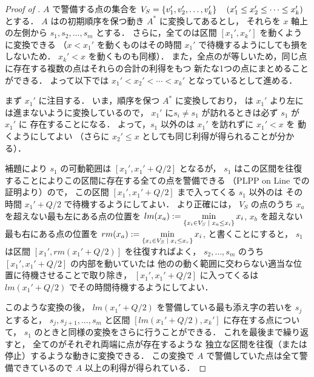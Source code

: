 \begin{proof}[Proof of ]
	$A$ で警備する点の集合を
	$V_S = \left\{{ v_1', v_2', \ldots, v_k' }\right\}
	 \quad (  x_1' \leq x_2' \leq \cdots \leq x_k'  )$
	とする．
	$A$ は\server の初期順序を保つ動き $A^*$ に変換してあるとし，
	それらを $x$ 軸上の左側から $s_1, s_2, \ldots, s_m$ とする．
	さらに，全ての\server は区間 $[x_1', x_k']$ を動くように変換できる
	（$x < x_1'$ を動くものはその時間 $x_1'$ で待機するようにしても損をしないため．
	$x_k' < x$ を動くものも同様）．
	また，全点の\shuki が等しいため，同じ点に存在する複数の点はそれらの合計の利得をもつ
	新たな1つの点にまとめることができる．
	よって以下では $x_1' < x_2' < \cdots < x_k'$ となっているとして進める．

	まず $x_1'$ に注目する．
	いま，\server 順序を保つ $A^*$ に変換しており，
	\server は $x_1'$ より左には進まないように変換しているので，
	$x_1'$ に\server $s_i \neq s_1$ が訪れるときは必ず $s_1$ が $x_1'$ に
	存在することになる．
	よって，$s_1$ 以外の\server は $x_1'$ を訪れずに $x_1' < x$ を
	動くようにしてよい （さらに $x_2' \leq x$ としても同じ利得が得られることが分かる）．

	補題により $s_1$ の可動範囲は
	$[x_1', x_1' + Q/2]$ となるが，
	$s_1$ はこの区間を往復することによりこの区間に存在する全ての点を警備できる
	（PLPP on Line での証明より）ので，
	この区間 $[x_1', x_1' + Q/2]$ まで入ってくる $s_1$ 以外の\server は
	その時間 $x_1' + Q/2$ で待機するようにしてよい．
	より正確には，
	$V_S$ の点のうち
	$x_a$ を超えない最も左にある点の位置を
	$lm(x_a) := \min\limits_{ \left\{{ x_i \in V_S }\;\middle|\;{ x_a \leq x_i }\right\} } x_i$, 
	$x_b$ を超えない最も右にある点の位置を
	$rm(x_a) := \min\limits_{ \left\{{ x_i \in V_S }\;\middle|\;{ x_i \leq x_r }\right\} } x_i$, 
	と書くことにすると，
	$s_1$ は区間 $[x_1', rm(x_1' + Q/2)]$ を往復すればよく，
	$s_2, \ldots, s_m$ のうち
	$[x_1', x_1' + Q/2]$ の内部を動いていた\server は
	他の\server の動く範囲に交わらない適当な位置に待機させることで取り除き，
	$[x_1', x_1' + Q/2]$ に入ってくる\server は
	$lm(x_1' + Q/2)$ でその時間待機するようにしてよい．

	このような変換の後，
	$lm(x_1' + Q/2)$ を警備している最も添え字の若い\server を $s_j$ とすると，
	$s_j, s_{j + 1}, \ldots, s_m$ と区間 $[lm(x_1' + Q/2), x_k']$
	に存在する点について， $s_1$ のときと同様の変換をさらに行うことができる．
	これを最後まで繰り返すと，
	全ての\server がそれぞれ両端に点が存在するような
	独立な区間を往復（または停止）するような動きに変換できる．
	この変換で $A$ で警備していた点は全て警備できているので $A$ 以上の利得が得られている．
\end{proof}


